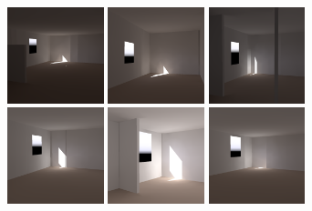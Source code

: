 \documentclass[review]{vgtc}                 %
\begin{document}
\begin{figure}[t]

\includegraphics[width=1.1in]{images/renderings/ground_truth/mrc331_camera_chris_march.png} \hfill  %
\includegraphics[width=1.1in]{images/renderings/renovations/065_camera_chris_march.png} \hfill %
\includegraphics[width=1.1in]{images/renderings/renovations/038_camera_chris_march.png} \hfill   %
\includegraphics[width=1.1in]{images/renderings/renovations/042_camera_chris_march.png} \hfill   %
\includegraphics[width=1.1in]{images/renderings/renovations/031_camera_chris_march.png} \hfill   %
\includegraphics[width=1.1in]{images/renderings/renovations/014_camera_chris_march.png}\vspace{-0.13in}\\   %


\end{figure}
\end{document}
